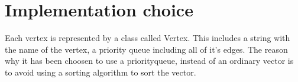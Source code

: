 \documentclass[10pt,a4paper]{article}
\begin{document}
\section{Implementation choice}
Each vertex is represented by a class called Vertex. This includes a string with the name of the vertex, a priority queue  including all of it's edges.  The reason why it has been choosen to use a priorityqueue, instead of an ordinary vector  is to avoid using a sorting algorithm to sort the vector. 
\end{document}

